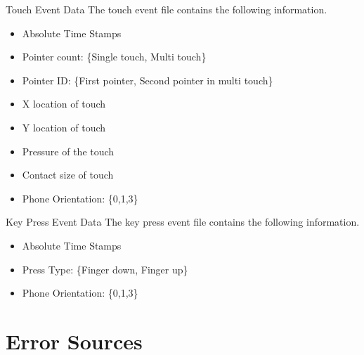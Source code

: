 \documentclass[10pt]{beamer}
\begin{document}
\begin{frame} {Touch Event Data}
The touch event file contains the following information.
\begin{itemize}
\item Absolute Time Stamps
\item Pointer count: \{Single touch, Multi touch\}
\item Pointer ID: \{First pointer, Second pointer in multi touch\}
\item X location of touch
\item Y location of touch
\item Pressure of the touch 
\item Contact size of touch
\item Phone Orientation: \{0,1,3\}
\end{itemize}
\end{frame}

\begin{frame} {Key Press Event Data}
The key press event file contains the following information.
\begin{itemize}
\item Absolute Time Stamps
\item Press Type: \{Finger down, Finger up\}
\item Phone Orientation: \{0,1,3\}
\end{itemize}
\end{frame}


\section{Error Sources}
\end{document}
